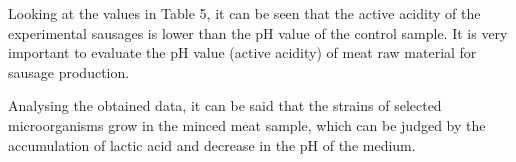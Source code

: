% 
% 

Looking at the values in Table 5, it can be seen that the active acidity
of the experimental sausages is lower than the pH value of the control
sample. It is very important to evaluate the pH value (active acidity)
of meat raw material for sausage production.

Analysing the obtained data, it can be said that the strains of selected
microorganisms grow in the minced meat sample, which can be judged by
the accumulation of lactic acid and decrease in the pH of the medium.

